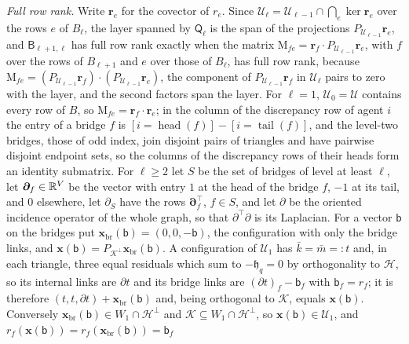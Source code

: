 \emph{Full row rank.} Write \(\mathbf r_e\) for the covector of \(r_e\).
Since \(\mathcal U_\ell=\mathcal U_{\ell-1}\cap\bigcap_e\ker\mathbf r_e\) over
the rows \(e\) of \(B_\ell\), the layer spanned by \(\mathsf Q_\ell\) is the
span of the projections \(P_{\mathcal U_{\ell-1}}\mathbf r_e\), and
\(\mathsf B_{\ell+1,\ell}\) has full row rank exactly when the matrix
\(\mathrm M_{fe}=\mathbf r_f\cdot P_{\mathcal U_{\ell-1}}\mathbf r_e\), with
\(f\) over the rows of \(B_{\ell+1}\) and \(e\) over those of \(B_\ell\), has
full row rank, because
\(\mathrm M_{fe}=(P_{\mathcal U_{\ell-1}}\mathbf r_f)\cdot(P_{\mathcal U_{\ell-1}}\mathbf r_e)\),
the component of \(P_{\mathcal U_{\ell-1}}\mathbf r_f\) in \(\mathcal U_\ell\)
pairs to zero with the layer, and the second factors span the layer. For
\(\ell=1\), \(\mathcal U_0=\mathcal U\) contains every row of \(B\), so
\(\mathrm M_{fe}=\mathbf r_f\cdot\mathbf r_e\); in the column of the
discrepancy row of agent \(i\) the entry of a bridge \(f\) is
\([i=\operatorname{head}(f)]-[i=\operatorname{tail}(f)]\), and the level-two
bridges, those of odd index, join disjoint pairs of triangles and have
pairwise disjoint endpoint sets, so the columns of the discrepancy rows of
their heads form an identity submatrix. For \(\ell\ge2\) let \(S\) be the
set of bridges of level at least \(\ell\), let \(\boldsymbol\partial_f\in\mathbb R^V\)
be the vector with entry \(1\) at the head of the bridge \(f\), \(-1\) at its
tail, and \(0\) elsewhere, let \(\partial_S\) have the rows
\(\boldsymbol\partial_f^\top\), \(f\in S\), and let \(\partial\) be the
oriented incidence operator of the whole graph, so that
\(\partial^\top\partial\) is its Laplacian. For a vector \(\mathsf b\) on the
bridges put \(\mathbf x_{\mathrm{br}}(\mathsf b)=(0,0,-\mathsf b)\), the
configuration with only the bridge links, and
\(\mathbf x(\mathsf b)=P_{\mathcal K^\perp}\mathbf x_{\mathrm{br}}(\mathsf b)\).
A configuration of \(\mathcal U_1\) has \(\bar k=\bar m=:t\) and, in each
triangle, three equal residuals which sum to \(-\mathfrak h_q=0\) by
orthogonality to \(\mathcal H\), so its internal links are \(\partial t\) and
its bridge links are \((\partial t)_f-\mathsf b_f\) with \(\mathsf b_f=r_f\);
it is therefore \((t,t,\partial t)+\mathbf x_{\mathrm{br}}(\mathsf b)\) and,
being orthogonal to \(\mathcal K\), equals \(\mathbf x(\mathsf b)\).
Conversely \(\mathbf x_{\mathrm{br}}(\mathsf b)\in W_1\cap\mathcal H^\perp\)
and \(\mathcal K\subseteq W_1\cap\mathcal H^\perp\), so
\(\mathbf x(\mathsf b)\in\mathcal U_1\), and
\(r_f(\mathbf x(\mathsf b))=r_f(\mathbf x_{\mathrm{br}}(\mathsf b))=\mathsf b_f\)
